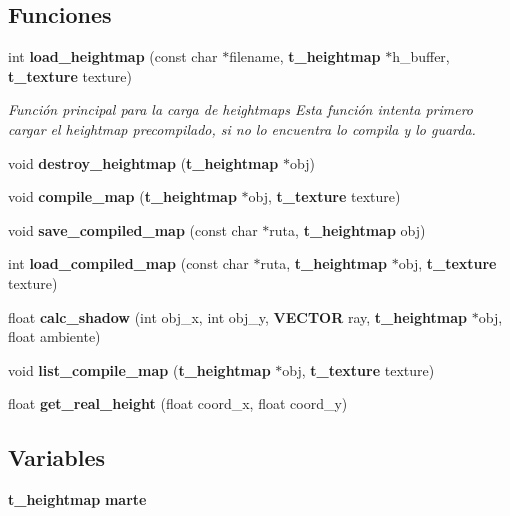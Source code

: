\subsection*{Funciones}
\begin{DoxyCompactItemize}
\item 
int {\bf load\_\-heightmap} (const char $\ast$filename, {\bf t\_\-heightmap} $\ast$h\_\-buffer, {\bf t\_\-texture} texture)
\begin{DoxyCompactList}\small\item\em Función principal para la carga de heightmaps Esta función intenta primero cargar el heightmap precompilado, si no lo encuentra lo compila y lo guarda. \item\end{DoxyCompactList}\item 
void {\bfseries destroy\_\-heightmap} ({\bf t\_\-heightmap} $\ast$obj)\label{heightmap_8h_a96fef409bbc870002703c7a55d2591c9}

\item 
void {\bfseries compile\_\-map} ({\bf t\_\-heightmap} $\ast$obj, {\bf t\_\-texture} texture)\label{heightmap_8h_ac95a5ca74fe1123edc7e88fe2b4c1cd0}

\item 
void {\bfseries save\_\-compiled\_\-map} (const char $\ast$ruta, {\bf t\_\-heightmap} obj)\label{heightmap_8h_a0ea2caf90742c16e0a103f91668bb359}

\item 
int {\bfseries load\_\-compiled\_\-map} (const char $\ast$ruta, {\bf t\_\-heightmap} $\ast$obj, {\bf t\_\-texture} texture)\label{heightmap_8h_a02c72f16c50a4499ae51a664bd02e9a3}

\item 
float {\bfseries calc\_\-shadow} (int obj\_\-x, int obj\_\-y, {\bf VECTOR} ray, {\bf t\_\-heightmap} $\ast$obj, float ambiente)\label{heightmap_8h_a752b82b3bd6b16cbfac7ac591bacdbc1}

\item 
void {\bfseries list\_\-compile\_\-map} ({\bf t\_\-heightmap} $\ast$obj, {\bf t\_\-texture} texture)\label{heightmap_8h_ad85161fbb63b928eaabb16f0f3275683}

\item 
float {\bfseries get\_\-real\_\-height} (float coord\_\-x, float coord\_\-y)\label{heightmap_8h_ac853e2c0c9e5c2c52b7d948d0fab7fb7}

\end{DoxyCompactItemize}
\subsection*{Variables}
\begin{DoxyCompactItemize}
\item 
{\bf t\_\-heightmap} {\bfseries marte}\label{heightmap_8h_a0bbad8f0b11f3175c39708fe30d5302f}

\end{DoxyCompactItemize}


